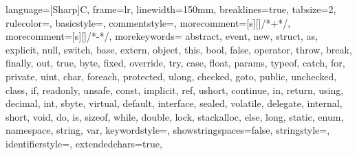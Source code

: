 \usepackage{listings}
\usepackage{listing}

\newcommand\digitstyle{\color{smagenta}}
\newcommand\symbolstyle{\color{base01}}
 {
  language=[Sharp]C,
  frame=lr,
  linewidth=150mm,
  breaklines=true,
  tabsize=2,
  rulecolor=\color{base2},
  basicstyle=\footnotesize\ttfamily,
  commentstyle=\color{base01},
  morecomment=[s][\color{base01}]{/*+}{*/},
  morecomment=[s][\color{base01}]{/*-}{*/},
  morekeywords={  abstract, event, new, struct,
                as, explicit, null, switch,
                base, extern, object, this,
                bool, false, operator, throw,
                break, finally, out, true,
                byte, fixed, override, try,
                case, float, params, typeof,
                catch, for, private, uint,
                char, foreach, protected, ulong,
                checked, goto, public, unchecked,
                class, if, readonly, unsafe,
                const, implicit, ref, ushort,
                continue, in, return, using,
                decimal, int, sbyte, virtual,
                default, interface, sealed, volatile,
                delegate, internal, short, void,
                do, is, sizeof, while,
                double, lock, stackalloc,
                else, long, static,
                enum, namespace, string, var},
  keywordstyle=\color{sgreen},
  showstringspaces=false,
  stringstyle=\color{scyan},
  identifierstyle=\color{sblue},
  extendedchars=true,
}


